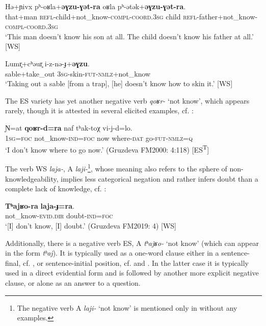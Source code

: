 \documentclass[output=paper,colorlinks,citecolor=brown]{langscibook}
\begin{document}
\ea\label{ex:niv:91}
    \gll Hə+ɲivx pʰ-oʁla+\textbf{əɣzu-ɣət-ra} oʁla pʰ-ətək+\textbf{əɣzu-ɣət-ra}. \\ 
         that+man \textsc{refl-}child+not\_know-\textsc{compl-coord.3sg} child \textsc{refl-}father+not\_know-\textsc{compl-coord.3sg} \\
    \glt ‘This man doesn’t know his son at all. The child doesn’t know his father at all.’ \citep[161]{Panfilov1965} [WS]
\z 

\ea\label{ex:niv:92}
    \gll Lumr̥+cʰəur̥ i-z-nə{}-ɟ+\textbf{əɣzu}. \\ 
         sable+take\_out \textsc{3sg}{}-skin-\textsc{fut-nmlz}+not\_know \\
    \glt ‘Taking out a sable [from a trap], [he] doesn’t know how to skin it.’ \citep[248]{Panfilov1965} [WS]
\z 

The ES variety has yet another negative verb \textit{qoʁr-} ‘not know’, which appears rarely, though it is attested in several elicited examples, cf. :


\ea\label{ex:niv:93}
    \gll Ɲ=at \textbf{qoʁr-d=ra} naf tʰak-toχ vi-j-d=lo. \\ 
         \textsc{1sg}=\textsc{foc} not\_know-\textsc{ind=foc} now where-\textsc{dat} go-\textsc{fut-nmlz=q} \\
    \glt ‘I don’t know where to go now.’ (Gruzdeva FM2000: 4:118) [ES\textsuperscript{T}]
\z 

The verb WS \textit{laja-}, A \textit{laji-}\footnote{The negative verb A \textit{laji-} ‘not know’ is mentioned only in \citet[161]{Panfilov1965} without any examples.}, whose meaning also refers to the sphere of non-knowledgeability, implies less categorical negation and rather infers doubt than a complete lack of knowledge, cf. :

\ea\label{ex:niv:94}
    \gll \textbf{Tʰajʁo-ra} \textbf{laja-ɟ=ra}. \\ 
         not\_know-\textsc{evid.dir} doubt-\textsc{ind=foc} \\
    \glt ‘[I] don’t know, [I] doubt.’ (Gruzdeva FM2019: 4) [WS]
\z 

Additionally, there is a negative verb ES, A \textit{tʰajʁo-} ‘not know’ (which can appear in the form \textit{tʰaj}). It is typically used as a one-word clause either in a sentence-final, cf. , or sentence-initial position, cf.  and . In the latter case it is typically used in a direct evidential form and is followed by another more explicit negative clause, or alone as an answer to a question.
\end{document}
